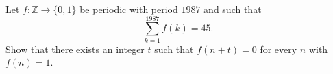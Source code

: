 Let $f : \mathbb{Z} \to \{0, 1\}$ be periodic with period $1987$ and such that
\[
\sum_{k=1}^{1987} f(k) = 45.
\]
Show that there exists an integer $t$ such that $f(n + t) = 0$ for every $n$ with $f(n) = 1$.

